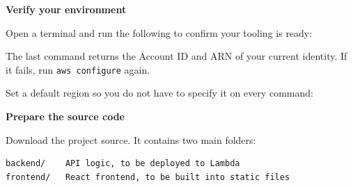 \vspace{0.5em}\noindent\textbf{Verify your environment}\par

Open a terminal and run the following to confirm your tooling is ready:

\begin{Shaded}
\begin{Highlighting}[]
 
 
\end{Highlighting}
\end{Shaded}

The last command returns the Account ID and ARN of your current
identity. If it fails, run \texttt{aws\ configure} again.

Set a default region so you do not have to specify it on every command:

\begin{Shaded}
\begin{Highlighting}[]
 \OperatorTok{=}
\end{Highlighting}
\end{Shaded}

\vspace{0.5em}\noindent\textbf{Prepare the source code}\par

Download the project source. It contains two main folders:

\begin{verbatim}
backend/    API logic, to be deployed to Lambda
frontend/   React frontend, to be built into static files
\end{verbatim}
